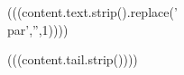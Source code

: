 \begin{solution}{}
(((content.text.strip().replace('\\par','',1))))
\end{solution}
(((content.tail.strip())))

